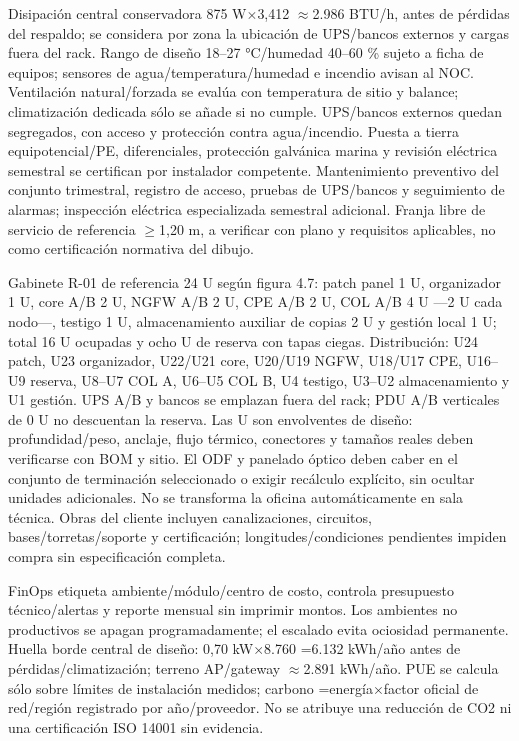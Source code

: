 \documentclass[11pt,letterpaper]{report}
\begin{document}
Disipación central conservadora 875 W$\times$3,412 $\approx$2.986 BTU/h, antes de pérdidas del respaldo; se considera por zona la ubicación de UPS/bancos externos y cargas fuera del rack. Rango de diseño 18--27 °C/humedad 40--60 \% sujeto a ficha de equipos; sensores de agua/temperatura/humedad e incendio avisan al NOC. Ventilación natural/forzada se evalúa con temperatura de sitio y balance; climatización dedicada sólo se añade si no cumple. UPS/bancos externos quedan segregados, con acceso y protección contra agua/incendio. Puesta a tierra equipotencial/PE, diferenciales, protección galvánica marina y revisión eléctrica semestral se certifican por instalador competente. Mantenimiento preventivo del conjunto trimestral, registro de acceso, pruebas de UPS/bancos y seguimiento de alarmas; inspección eléctrica especializada semestral adicional. Franja libre de servicio de referencia $\geq$1,20 m, a verificar con plano y requisitos aplicables, no como certificación normativa del dibujo.

Gabinete R-01 de referencia 24 U según figura 4.7: patch panel 1 U, organizador 1 U, core A/B 2 U, NGFW A/B 2 U, CPE A/B 2 U, COL A/B 4 U ---2 U cada nodo---, testigo 1 U, almacenamiento auxiliar de copias 2 U y gestión local 1 U; total 16 U ocupadas y ocho U de reserva con tapas ciegas. Distribución: U24 patch, U23 organizador, U22/U21 core, U20/U19 NGFW, U18/U17 CPE, U16--U9 reserva, U8--U7 COL A, U6--U5 COL B, U4 testigo, U3--U2 almacenamiento y U1 gestión. UPS A/B y bancos se emplazan fuera del rack; PDU A/B verticales de 0 U no descuentan la reserva. Las U son envolventes de diseño: profundidad/peso, anclaje, flujo térmico, conectores y tamaños reales deben verificarse con BOM y sitio. El ODF y panelado óptico deben caber en el conjunto de terminación seleccionado o exigir recálculo explícito, sin ocultar unidades adicionales. No se transforma la oficina automáticamente en sala técnica. Obras del cliente incluyen canalizaciones, circuitos, bases/torretas/soporte y certificación; longitudes/condiciones pendientes impiden compra sin especificación completa.

FinOps etiqueta ambiente/módulo/centro de costo, controla presupuesto técnico/alertas y reporte mensual sin imprimir montos. Los ambientes no productivos se apagan programadamente; el escalado evita ociosidad permanente. Huella borde central de diseño: 0,70 kW$\times$8.760 =6.132 kWh/año antes de pérdidas/climatización; terreno AP/gateway $\approx$2.891 kWh/año. PUE se calcula sólo sobre límites de instalación medidos; carbono =energía$\times$factor oficial de red/región registrado por año/proveedor. No se atribuye una reducción de CO2 ni una certificación ISO 14001 sin evidencia.
\end{document}
